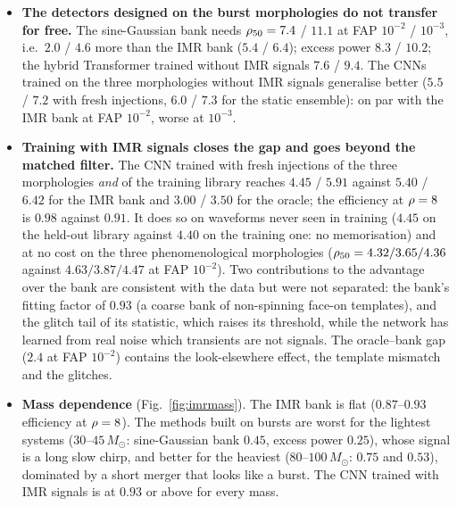 \begin{itemize}[nosep]
\item \textbf{The detectors designed on the burst morphologies do not transfer for free.} The sine-Gaussian bank needs $\rho_{50}=7.4$ / $11.1$ at FAP $10^{-2}$ / $10^{-3}$, i.e.\ $2.0$ / $4.6$ more than the IMR bank ($5.4$ / $6.4$); excess power $8.3$ / $10.2$; the hybrid Transformer trained without IMR signals $7.6$ / $9.4$. The CNNs trained on the three morphologies without IMR signals generalise better ($5.5$ / $7.2$ with fresh injections, $6.0$ / $7.3$ for the static ensemble): on par with the IMR bank at FAP $10^{-2}$, worse at $10^{-3}$.
\item \textbf{Training with IMR signals closes the gap and goes beyond the matched filter.} The CNN trained with fresh injections of the three morphologies \emph{and} of the training library reaches $4.45$ / $5.91$ against $5.40$ / $6.42$ for the IMR bank and $3.00$ / $3.50$ for the oracle; the efficiency at $\rho=8$ is $0.98$ against $0.91$. It does so on waveforms never seen in training ($4.45$ on the held-out library against $4.40$ on the training one: no memorisation) and at no cost on the three phenomenological morphologies ($\rho_{50}=4.32/3.65/4.36$ against $4.63/3.87/4.47$ at FAP $10^{-2}$). Two contributions to the advantage over the bank are consistent with the data but were not separated: the bank's fitting factor of $0.93$ (a coarse bank of non-spinning face-on templates), and the glitch tail of its statistic, which raises its threshold, while the network has learned from real noise which transients are not signals. The oracle--bank gap ($2.4$ at FAP $10^{-2}$) contains the look-elsewhere effect, the template mismatch and the glitches.
\item \textbf{Mass dependence} (Fig.~\ref{fig:imrmass}). The IMR bank is flat ($0.87$--$0.93$ efficiency at $\rho=8$). The methods built on bursts are worst for the lightest systems ($30$--$45\,M_\odot$: sine-Gaussian bank $0.45$, excess power $0.25$), whose signal is a long slow chirp, and better for the heaviest ($80$--$100\,M_\odot$: $0.75$ and $0.53$), dominated by a short merger that looks like a burst. The CNN trained with IMR signals is at $0.93$ or above for every mass.
\end{itemize}

